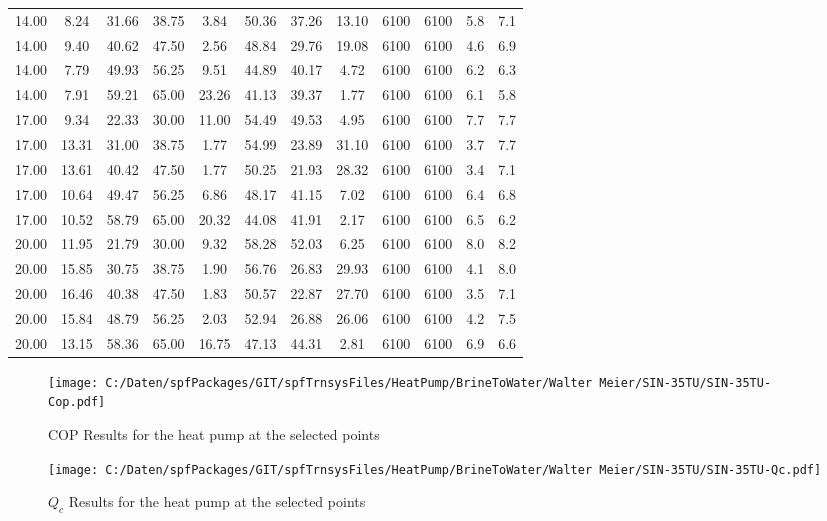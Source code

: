 \documentclass[english]{SPFShortReport}
\begin{document}
\begin{table}[!ht]
\begin{small}
\begin{center}
{\begin{tabular}{l | c c c c c c c c c c c }
14.00 & 8.24 & 31.66 & 38.75 & 3.84 & 50.36 & 37.26 & 13.10 & 6100 & 6100 & 5.8 & 7.1\\ 
14.00 & 9.40 & 40.62 & 47.50 & 2.56 & 48.84 & 29.76 & 19.08 & 6100 & 6100 & 4.6 & 6.9\\ 
14.00 & 7.79 & 49.93 & 56.25 & 9.51 & 44.89 & 40.17 & 4.72 & 6100 & 6100 & 6.2 & 6.3\\ 
14.00 & 7.91 & 59.21 & 65.00 & 23.26 & 41.13 & 39.37 & 1.77 & 6100 & 6100 & 6.1 & 5.8\\ 
17.00 & 9.34 & 22.33 & 30.00 & 11.00 & 54.49 & 49.53 & 4.95 & 6100 & 6100 & 7.7 & 7.7\\ 
17.00 & 13.31 & 31.00 & 38.75 & 1.77 & 54.99 & 23.89 & 31.10 & 6100 & 6100 & 3.7 & 7.7\\ 
17.00 & 13.61 & 40.42 & 47.50 & 1.77 & 50.25 & 21.93 & 28.32 & 6100 & 6100 & 3.4 & 7.1\\ 
17.00 & 10.64 & 49.47 & 56.25 & 6.86 & 48.17 & 41.15 & 7.02 & 6100 & 6100 & 6.4 & 6.8\\ 
17.00 & 10.52 & 58.79 & 65.00 & 20.32 & 44.08 & 41.91 & 2.17 & 6100 & 6100 & 6.5 & 6.2\\ 
20.00 & 11.95 & 21.79 & 30.00 & 9.32 & 58.28 & 52.03 & 6.25 & 6100 & 6100 & 8.0 & 8.2\\ 
20.00 & 15.85 & 30.75 & 38.75 & 1.90 & 56.76 & 26.83 & 29.93 & 6100 & 6100 & 4.1 & 8.0\\ 
20.00 & 16.46 & 40.38 & 47.50 & 1.83 & 50.57 & 22.87 & 27.70 & 6100 & 6100 & 3.5 & 7.1\\ 
20.00 & 15.84 & 48.79 & 56.25 & 2.03 & 52.94 & 26.88 & 26.06 & 6100 & 6100 & 4.2 & 7.5\\ 
20.00 & 13.15 & 58.36 & 65.00 & 16.75 & 47.13 & 44.31 & 2.81 & 6100 & 6100 & 6.9 & 6.6\\ 
\hline
\hline
\end{tabular}
}
\label{ResultsTable}
\end{center}
\end{small}
\end{table}
\begin{figure}[!ht]
\begin{center}
\texttt{[image: C:/Daten/spfPackages/GIT/spfTrnsysFiles/HeatPump/BrineToWater/Walter Meier/SIN-35TU/SIN-35TU-Cop.pdf]}
\caption{COP Results for the heat pump at the selected points}
\label{COPFig}
\end{center}
\end{figure}
\begin{figure}[!ht]
\begin{center}
\texttt{[image: C:/Daten/spfPackages/GIT/spfTrnsysFiles/HeatPump/BrineToWater/Walter Meier/SIN-35TU/SIN-35TU-Qc.pdf]}
\caption{$Q_c$ Results for the heat pump at the selected points}
\label{QcFig}
\end{center}
\end{figure}
\end{document}
